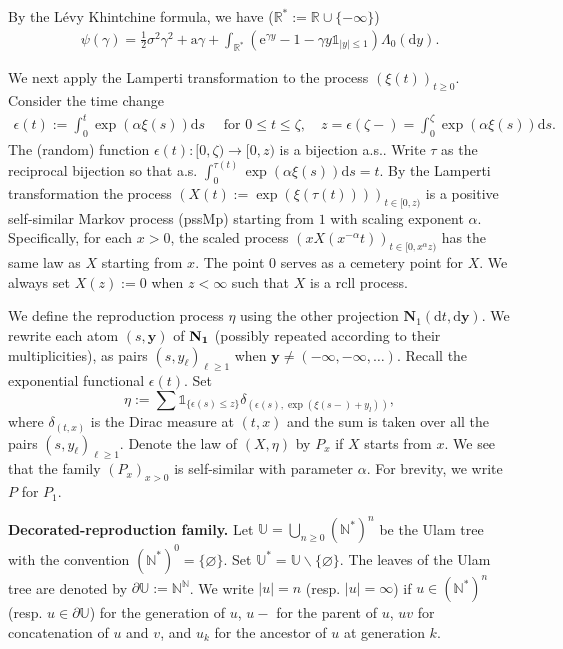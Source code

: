 \documentclass[12pt]{article}
\numberwithin{equation}{section}
\theoremstyle{plain}
\theoremstyle{definition}
\newcommand{\D}{\mathrm{d}}
\newcommand{\Bd}[1]{\boldsymbol{#1}}
\begin{document}
\noindent By the L\'evy Khintchine formula, we have ($\mathbb R^*:=\mathbb R \cup \{-\infty\}$)
\begin{align}\label{eq: def psi}
    \psi(\gamma) = \frac{1}{2}\sigma^2\gamma^2 + \mathrm{a}\gamma + \int_{\mathbb{R}^*}(\mathrm{e}^{\gamma y} - 1 - \gamma y\mathds{1}_{|y|\leq 1})\Lambda_0(\D y).
\end{align}

We next apply the Lamperti transformation to the process $(\xi(t))_{t\ge 0}$. Consider the time change
\begin{align*}
     \epsilon(t):=\int_0^t \exp(\alpha\xi(s))\D s \quad\text{ for }0\le t\le \zeta, \quad z=\epsilon(\zeta-)=\int_0^{\zeta} \exp(\alpha\xi(s))\D s.
\end{align*}
The (random) function $\epsilon(t):[0,\zeta)\to [0,z)$ is a bijection a.s.. Write $\tau$ as the reciprocal bijection so that a.s. $\int_{0}^{\tau(t)}\exp(\alpha \xi(s))\D s=t$. By the Lamperti transformation the process $(X(t):=\exp (\xi(\tau(t))))_{t\in[0, z)}$ is a positive self-similar Markov process (pssMp) starting from $1$ with scaling exponent $\alpha$. Specifically, for each $x>0$, the scaled process $(xX(x^{-\alpha}t))_{t\in [0, x^\alpha z)}$ has the same law as $X$ starting from $x$. The point $0$ serves as a cemetery point for $X$. We always set $X(z):=0$ when $z<\infty$ such that $X$ is a rcll process.

We define the reproduction process $\eta$ using the other projection $\mathbf{N}_1(\D t, \D\Bd y)$. We rewrite each atom $(s,\boldsymbol{y})$ of $\bf N_1$ (possibly repeated according to their multiplicities), as pairs $(s, y_{\ell})_{\ell\ge 1}$ when $\boldsymbol{y}\neq (-\infty,-\infty,\dots)$. Recall the exponential functional $\epsilon(t)$. Set
\begin{equation}\label{eq: def eta}
    \eta:=\sum \mathds{1}_{\{ \epsilon(s)\le z\}} \delta_{(\epsilon(s),\exp (\xi(s-)+y_l))},
\end{equation}
where $\delta_{(t,x)}$ is the Dirac measure at $(t,x)$ and the sum is taken over all the pairs $(s, y_{\ell})_{\ell\ge 1}$. Denote the law of $(X, \eta)$ by $P_x$ if $X$ starts from $x$. We see that the family $(P_x)_{x>0}$ is self-similar with parameter $\alpha$. For brevity, we write $ P$ for $ P_1$.

\bigskip

\noindent \textbf{Decorated-reproduction family.} Let $\mathbb{U} = \bigcup_{n\geq 0} (\mathbb{N}^*)^n$ be the Ulam tree with the convention $(\mathbb{N}^*)^0 = \{\varnothing\}$. Set $\mathbb{U}^* = \mathbb{U}\backslash \{\varnothing\}$. The leaves of the Ulam tree are denoted by $\partial\mathbb{U} := \mathbb{N}^{\mathbb{N}}$. We write $|u| = n$ (resp. $|u| = \infty$) if $u\in(\mathbb{N}^*)^n$ (resp. $u\in\partial\mathbb{U}$) for the generation of $u$, $u-$ for the parent of $u$, $uv$ for concatenation of $u$ and $v$, and $u_k$ for the ancestor of $u$ at generation $k$.
\end{document}
